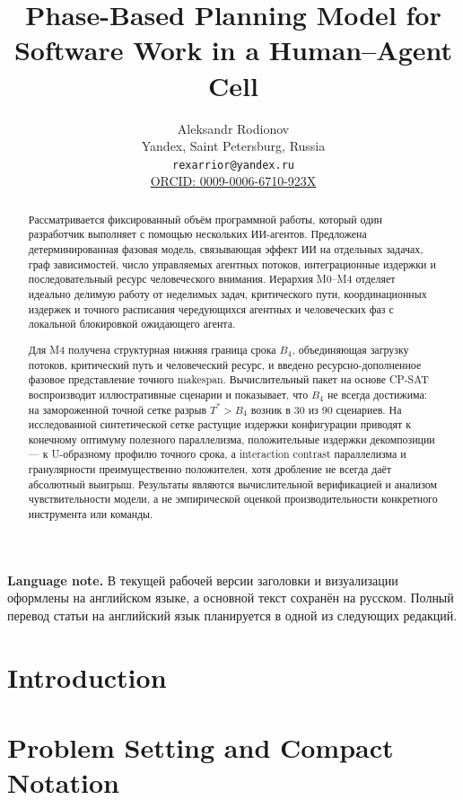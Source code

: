 \documentclass[12pt,a4paper]{article}
\title{Phase-Based Planning Model for Software Work in a Human--Agent Cell}
\author{Aleksandr Rodionov\\
Yandex, Saint Petersburg, Russia\\
\texttt{rexarrior@yandex.ru}\\
\href{https://orcid.org/0009-0006-6710-923X}{ORCID: 0009-0006-6710-923X}}
\date{}
\theoremstyle{definition}
\begin{document}
\maketitle

\begin{abstract}
Рассматривается фиксированный объём программной работы, который один
разработчик выполняет с помощью нескольких ИИ-агентов. Предложена
детерминированная фазовая модель, связывающая эффект ИИ на отдельных задачах,
граф зависимостей, число управляемых агентных потоков, интеграционные издержки
и последовательный ресурс человеческого внимания. Иерархия M0--M4 отделяет
идеально делимую работу от неделимых задач, критического пути,
координационных издержек и точного расписания чередующихся агентных и
человеческих фаз с локальной блокировкой ожидающего агента.

Для M4 получена структурная нижняя граница срока $B_4$, объединяющая загрузку
потоков, критический путь и человеческий ресурс, и введено
ресурсно-дополненное фазовое представление точного makespan. Вычислительный пакет на основе CP-SAT
воспроизводит иллюстративные сценарии и показывает, что $B_4$ не всегда
достижима: на замороженной точной сетке разрыв $T^*>B_4$ возник в 30 из 90
сценариев. На исследованной синтетической сетке растущие издержки конфигурации
приводят к конечному оптимуму полезного параллелизма, положительные издержки
декомпозиции --- к U-образному профилю точного срока, а interaction contrast
параллелизма и гранулярности преимущественно положителен, хотя дробление не
всегда даёт абсолютный выигрыш. Результаты являются
вычислительной верификацией и анализом чувствительности модели, а не
эмпирической оценкой производительности конкретного инструмента или команды.
\end{abstract}

\noindent\textbf{Language note.}
В текущей рабочей версии заголовки и визуализации оформлены на английском
языке, а основной текст сохранён на русском. Полный перевод статьи на
английский язык планируется в одной из следующих редакций.

\section{Introduction}


\section{Problem Setting and Compact Notation}

\end{document}
